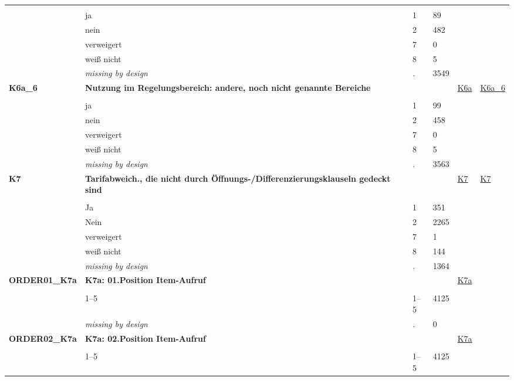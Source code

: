 \begin{longtable}{| L{2.45cm} | L{6cm} | C{1.5cm} | R{1cm} | C{2.25cm} | C{2.25cm} |}
   &  &  &  &  &  \\ 
   & ja & 1 & 89 &  &  \\ 
   & nein & 2 & 482 &  &  \\ 
   & verweigert & 7 & 0 &  &  \\ 
   & weiß nicht & 8 & 5 &  &  \\ 
   & \textit{missing by design} & \textit{.} & 3549 &  &  \\ 
   \midrule
\textbf{K6a\_6}\label{var:K6a:6} & \textbf{Nutzung im Regelungsbereich: andere, noch nicht genannte Bereiche} &  &  & \hyperref[K6a]{K6a} & \hyperref[var:suf:K6a:6]{K6a\_6} \\ 
   &  &  &  &  &  \\ 
   & ja & 1 & 99 &  &  \\ 
   & nein & 2 & 458 &  &  \\ 
   & verweigert & 7 & 0 &  &  \\ 
   & weiß nicht & 8 & 5 &  &  \\ 
   & \textit{missing by design} & \textit{.} & 3563 &  &  \\ 
   \midrule
\textbf{K7}\label{var:K7} & \textbf{Tarifabweich., die nicht durch Öffnungs-/Differenzierungsklauseln gedeckt sind} &  &  & \hyperref[K7]{K7} & \hyperref[var:suf:K7]{K7} \\ 
   &  &  &  &  &  \\ 
   & Ja & 1 & 351 &  &  \\ 
   & Nein & 2 & 2265 &  &  \\ 
   & verweigert & 7 & 1 &  &  \\ 
   & weiß nicht & 8 & 144 &  &  \\ 
   & \textit{missing by design} & \textit{.} & 1364 &  &  \\ 
   \midrule
\textbf{ORDER01\_K7a}\label{var:ORDER01:K7a} & \textbf{K7a: 01.Position Item-Aufruf} &  &  & \hyperref[K7a]{K7a} & \hyperref[var:suf:]{} \\ 
   &  &  &  &  &  \\ 
   & 1--5 & 1--5 & 4125 &  &  \\ 
   & \textit{missing by design} & \textit{.} & 0 &  &  \\ 
   \midrule
\textbf{ORDER02\_K7a}\label{var:ORDER02:K7a} & \textbf{K7a: 02.Position Item-Aufruf} &  &  & \hyperref[K7a]{K7a} & \hyperref[var:suf:]{} \\ 
   &  &  &  &  &  \\ 
   & 1--5 & 1--5 & 4125 &  &  \\ 

\end{longtable}
